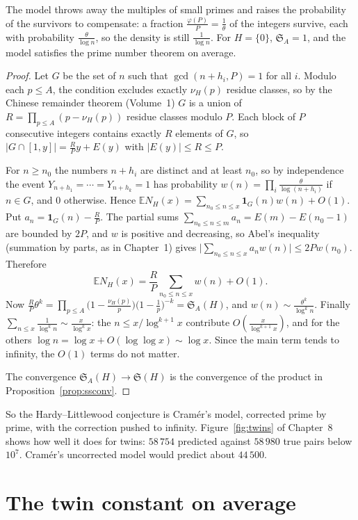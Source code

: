 The model throws away the multiples of small primes and raises the probability of the survivors to compensate: a fraction $\frac{\varphi(P)}P=\frac1\theta$ of the integers survive, each with probability
$\frac\theta{\log n}$, so the density is still $\frac1{\log n}$. For $H=\{0\}$, $\mathfrak S_A=1$, and the model satisfies the prime number theorem on average.

\begin{proof}
Let $G$ be the set of $n$ such that $\gcd(n+h_i,P)=1$ for all $i$. Modulo each $p\le A$, the condition excludes exactly $\nu_H(p)$ residue classes, so by the Chinese remainder theorem (Volume~1) $G$ is a union of
$R=\prod_{p\le A}(p-\nu_H(p))$ residue classes modulo $P$. Each block of $P$ consecutive integers contains exactly $R$ elements of $G$, so $|G\cap[1,y]|=\frac RPy+E(y)$ with $|E(y)|\le R\le P$.

For $n\ge n_0$ the numbers $n+h_i$ are distinct and at least $n_0$, so by independence the event $Y_{n+h_1}=\cdots=Y_{n+h_k}=1$ has probability $w(n)=\prod_i\frac\theta{\log(n+h_i)}$ if $n\in G$, and $0$ otherwise.
Hence $\mathbb EN_H(x)=\sum_{n_0\le n\le x}\mathbf 1_G(n)w(n)+O(1)$. Put $a_n=\mathbf 1_G(n)-\frac RP$. The partial sums $\sum_{n_0\le n\le m}a_n=E(m)-E(n_0-1)$ are bounded by $2P$, and $w$ is positive and decreasing, so Abel's
inequality (summation by parts, as in Chapter~1) gives $\bigl|\sum_{n_0\le n\le x}a_nw(n)\bigr|\le2Pw(n_0)$. Therefore
\[
\mathbb EN_H(x)=\frac RP\sum_{n_0\le n\le x}w(n)+O(1).
\]
Now $\frac RP\theta^k=\prod_{p\le A}\bigl(1-\frac{\nu_H(p)}p\bigr)\bigl(1-\frac1p\bigr)^{-k}=\mathfrak S_A(H)$, and $w(n)\sim\frac{\theta^k}{\log^kn}$. Finally $\sum_{n\le x}\frac1{\log^kn}\sim\frac x{\log^kx}$: the
$n\le x/\log^{k+1}x$ contribute $O(\frac x{\log^{k+1}x})$, and for the others $\log n=\log x+O(\log\log x)\sim\log x$. Since the main term tends to infinity, the $O(1)$ terms do not matter.

The convergence $\mathfrak S_A(H)\to\mathfrak S(H)$ is the convergence of the product in Proposition~\ref{prop:ssconv}.
\end{proof}

So the Hardy--Littlewood conjecture is Cramér's model, corrected prime by prime, with the correction pushed to infinity. Figure~\ref{fig:twins} of Chapter~8 shows how well it does for twins:
$58\,754$ predicted against $58\,980$ true pairs below $10^7$. Cramér's uncorrected model would predict about $44\,500$.

\section{The twin constant on average}

